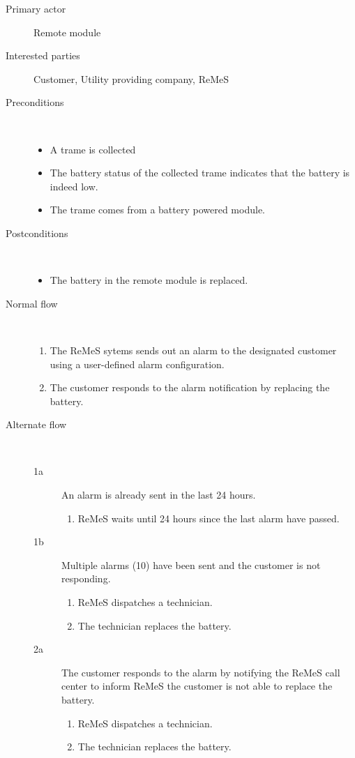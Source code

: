 \begin{description}
	\item[Primary actor] Remote module
	\item[Interested parties] Customer, Utility providing company, ReMeS
	\item[Preconditions] \ 
	\begin{itemize}
		\item A trame is collected
		\item The battery status of the collected trame indicates that the battery is
		indeed low.
		\item The trame comes from a battery powered module.
	\end{itemize}
	\item[Postconditions] \ 
	\begin{itemize}
		\item The battery in the remote module is replaced. 
	\end{itemize}
	\item[Normal flow] \ 
	\begin{enumerate}
	  	\item The ReMeS sytems sends out an alarm to the designated customer using a
	  	user-defined alarm configuration.
		\item The customer responds to the alarm notification by replacing the
		battery.
	\end{enumerate}
	\item[Alternate flow] \ 
	\begin{description}
		\item[1a] An alarm is already sent in the last 24 hours.
		\begin{enumerate}
			\item ReMeS waits until 24 hours since the last alarm have passed.
		\end{enumerate}
		\item[1b] Multiple alarms (10) have been sent and the customer is not
		responding.
		\begin{enumerate}
			\item ReMeS dispatches a technician.
			\item The technician replaces the battery.
		\end{enumerate}
		\item[2a] The customer responds to the alarm by notifying the ReMeS call
		center to inform ReMeS the customer is not able to replace the battery. 
		\begin{enumerate}
			\item ReMeS dispatches a technician.
			\item The technician replaces the battery.
		\end{enumerate}
	\end{description}
\end{description}